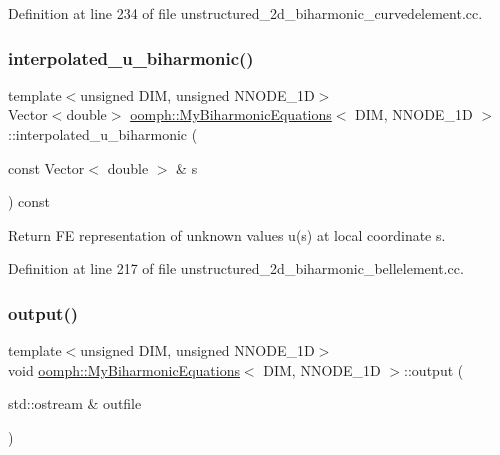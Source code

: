 Definition at line 234 of file unstructured\+\_\+2d\+\_\+biharmonic\+\_\+curvedelement.\+cc.

\mbox{\label{classoomph_1_1MyBiharmonicEquations_ac451e7d6ebf1dd94f0a0c122e3882d53}} 
\subsubsection{\texorpdfstring{interpolated\+\_\+u\+\_\+biharmonic()}{interpolated\_u\_biharmonic()}}
{\footnotesize\ttfamily template$<$unsigned D\+IM, unsigned N\+N\+O\+D\+E\+\_\+1D$>$ \\
Vector$<$double$>$ \hyperlink{classoomph_1_1MyBiharmonicEquations}{oomph\+::\+My\+Biharmonic\+Equations}$<$ D\+IM, N\+N\+O\+D\+E\+\_\+1D $>$\+::interpolated\+\_\+u\+\_\+biharmonic (\begin{DoxyParamCaption}\item[{const Vector$<$ double $>$ \&}]{s }\end{DoxyParamCaption}) const\hspace{0.3cm}{\ttfamily [inline]}}



Return FE representation of unknown values u(s) at local coordinate s. 



Definition at line 217 of file unstructured\+\_\+2d\+\_\+biharmonic\+\_\+bellelement.\+cc.

\mbox{\label{classoomph_1_1MyBiharmonicEquations_aa0d1248dcc8fcebd986c295d6af2ebf6}} 
\subsubsection{\texorpdfstring{output()}{output()}\hspace{0.1cm}{\footnotesize\ttfamily [1/8]}}
{\footnotesize\ttfamily template$<$unsigned D\+IM, unsigned N\+N\+O\+D\+E\+\_\+1D$>$ \\
void \hyperlink{classoomph_1_1MyBiharmonicEquations}{oomph\+::\+My\+Biharmonic\+Equations}$<$ D\+IM, N\+N\+O\+D\+E\+\_\+1D $>$\+::output (\begin{DoxyParamCaption}\item[{std\+::ostream \&}]{outfile }\end{DoxyParamCaption})\hspace{0.3cm}{\ttfamily [inline]}}



